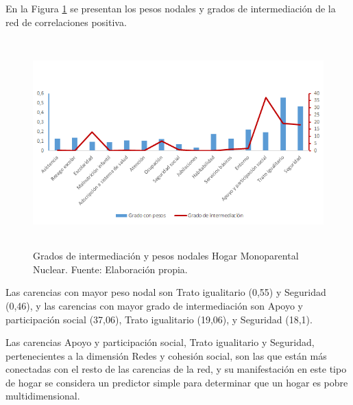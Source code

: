 \documentclass[12pt,letterpaper,spanish]{article}
\begin{document}
En la Figura \ref{CenMononuc} se presentan los pesos nodales y grados de intermediación de la red de correlaciones positiva.
\begin{figure}[H]
    \centering
    \includegraphics[height=8cm]{Grafos/nc_mononuc.png}
    \caption{Grados de intermediación y pesos nodales Hogar Monoparental Nuclear. Fuente: Elaboración propia.}
    \label{CenMononuc}
\end{figure}
Las carencias con mayor peso nodal son Trato igualitario (0,55) y Seguridad (0,46), y las carencias con mayor grado de intermediación son Apoyo y participación social (37,06), Trato igualitario (19,06), y Seguridad (18,1).

Las carencias Apoyo y participación social, Trato igualitario y Seguridad, pertenecientes a la dimensión Redes y cohesión social, son las que están más conectadas con el resto de las carencias de la red, y su manifestación en este tipo de hogar se considera un predictor simple para determinar que un hogar es pobre multidimensional.  
\end{document}
